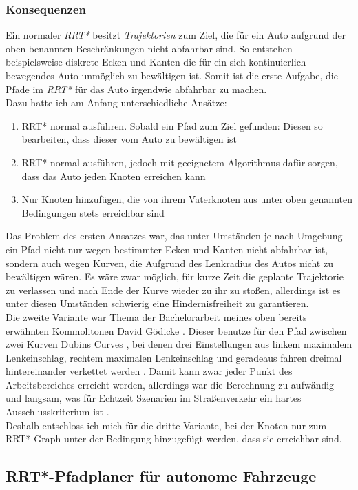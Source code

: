 \subsubsection{Konsequenzen}
Ein normaler \textit{RRT*} besitzt \textit{Trajektorien} zum Ziel, die für ein Auto aufgrund der oben benannten Beschränkungen nicht abfahrbar sind. So entstehen beispielsweise diskrete Ecken und Kanten die für ein sich kontinuierlich bewegendes Auto unmöglich zu bewältigen ist. Somit ist die erste Aufgabe, die Pfade im \textit{RRT*} für das Auto irgendwie abfahrbar zu machen.\\
Dazu hatte ich am Anfang unterschiedliche Ansätze:
\begin{enumerate}
\item RRT* normal ausführen. Sobald ein Pfad zum Ziel gefunden: Diesen so bearbeiten, dass dieser vom Auto zu bewältigen ist
\item RRT* normal ausführen, jedoch mit geeignetem Algorithmus dafür sorgen, dass das Auto jeden Knoten erreichen kann
\item Nur Knoten hinzufügen, die von ihrem Vaterknoten aus unter oben genannten Bedingungen stets erreichbar sind
\end{enumerate}
Das Problem des ersten Ansatzes war, das unter Umständen je nach Umgebung ein Pfad nicht nur wegen bestimmter Ecken und Kanten nicht abfahrbar ist, sondern auch wegen Kurven, die Aufgrund des Lenkradius des Autos nicht zu bewältigen wären. Es wäre zwar möglich, für kurze Zeit die geplante Trajektorie zu verlassen und nach Ende der Kurve wieder zu ihr zu stoßen, allerdings ist es unter diesen Umständen schwierig eine Hindernisfreiheit zu garantieren. \\
Die zweite Variante war Thema der Bachelorarbeit meines oben bereits erwähnten Kommolitonen David Gödicke \citep{Goedicke18}. Dieser benutze für den Pfad zwischen zwei Kurven Dubins Curves \citep{Dubin61}, bei denen drei Einstellungen aus linkem maximalem Lenkeinschlag, rechtem maximalen Lenkeinschlag und geradeaus fahren dreimal hintereinander verkettet werden . Damit kann zwar jeder Punkt des Arbeitsbereiches erreicht werden, allerdings war die Berechnung zu aufwändig und langsam, was für Echtzeit Szenarien im Straßenverkehr ein hartes Ausschlusskriterium ist \citep[vergleiche][Kapitel 7]{Goedicke18}. \\
Deshalb entschloss ich mich für die dritte Variante, bei der Knoten nur zum RRT*-Graph unter der Bedingung hinzugefügt werden, dass sie erreichbar sind.

\subsection{RRT*-Pfadplaner für autonome Fahrzeuge}
